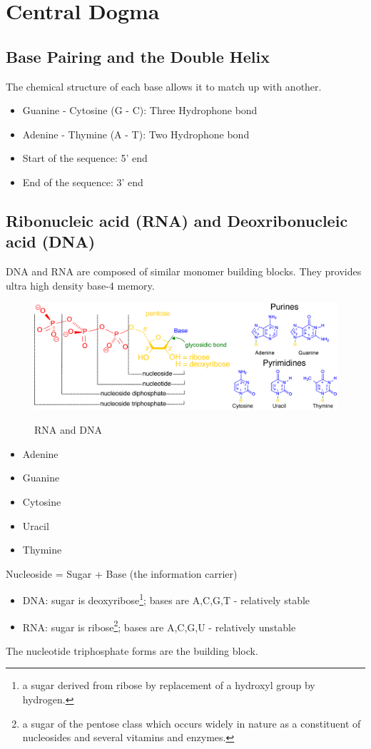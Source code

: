 \chapter{Central Dogma}

\section{Base Pairing and the Double Helix}
The chemical structure of each base allows it to match up with another.
\begin{itemize}
    \item Guanine - Cytosine (G - C): Three Hydrophone bond
    \item Adenine - Thymine (A - T): Two Hydrophone bond
    \item Start of the sequence: 5' end
    \item End of the sequence: 3' end
\end{itemize}

\section{Ribonucleic acid (RNA) and Deoxribonucleic acid (DNA)}

DNA and RNA are composed of similar monomer building blocks. They provides ultra high density base-4 memory.

\begin{figure}[h]
\centering
\includegraphics[width=1\textwidth]{images/Nucleotides.png}\\[.2in]
\caption{RNA and DNA} 
\end{figure}

\begin{itemize}
    \item {} Adenine
    \item {} Guanine
    \item {} Cytosine
    \item {} Uracil
    \item {} Thymine
\end{itemize}
Nucleoside = Sugar + Base (the information carrier)
\begin{itemize}
    \item DNA: sugar is deoxyribose\footnote{a sugar derived from ribose by replacement of a hydroxyl group by hydrogen.}; bases are A,C,G,T - relatively stable
    \item RNA: sugar is ribose\footnote{a sugar of the pentose class which occurs widely in nature as a constituent of nucleosides and several vitamins and enzymes.}; bases are A,C,G,U - relatively unstable
\end{itemize}
The nucleotide triphosphate forms are the building block.

